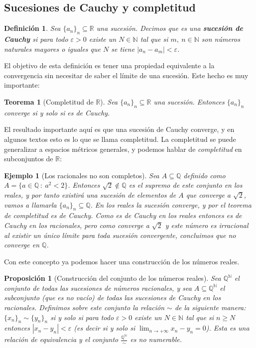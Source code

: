 \documentclass{article}
\newtheorem{theorem}{Teorema}
\newtheorem{prop}{Proposición}
\newtheorem{define}{Definición}
\newtheorem{ejem}{Ejemplo}
\newcommand{\reales}{\mathbb{R}}
\newcommand{\naturales}{\mathbb{N}}
\newcommand{\racionales}{\mathbb{Q}}
\newcommand{\sucesion}[1]{\{ #1 _n \}_n}
\newcommand{\sucreal}[1]{\{ #1 _n \}_n \subseteq \reales}
\newcommand{\limiten}[1]{\lim_{n \rightarrow +\infty} #1}
\begin{document}
\subsection{Sucesiones de Cauchy y completitud}
\begin{define}
	Sea $\sucreal{a}$ una sucesión. Decimos que es una \textbf{sucesión de Cauchy} si para todo $\varepsilon > 0$ existe un $N \in \naturales$ tal que si $m,\ n \in \naturales$ son números naturales mayores o iguales que $N$ se tiene $|a_n - a_m| < \varepsilon$.
\end{define}
El objetivo de esta definición es tener una propiedad equivalente a la convergencia sin necesitar de saber el límite de una sucesión. Este hecho es muy importante:
\begin{theorem}[Completitud de $\reales$]
	Sea $\sucreal{a}$ una sucesión. Entonces $\sucesion{a}$ converge si y solo si es de Cauchy.
\end{theorem}
El resultado importante aquí es que una sucesión de Cauchy converge, y en algunos textos esto es lo que se llama completitud.
La completitud se puede generalizar a espacios métricos generales, y podemos hablar de \textit{completitud} en subconjuntos de $\reales$:
\begin{ejem}[Los racionales no son completos]
	Sea $A \subseteq \racionales$ definido como $A = \{ a\in \racionales\ :\ a^2 < 2\}$. Entonces $\sqrt{2} \not\in \racionales$ es el supremo de este conjunto en los reales, y por tanto existirá una sucesión de elementos de $A$ que converge a $\sqrt{2}$, vamos a llamarla $\sucesion{a} \subseteq \racionales$. En los reales la sucesión converge, y por el teorema de completitud es de Cauchy. Como es de Cauchy en los reales entonces es de Cauchy en los racionales, pero como converge a $\sqrt{2}$ y este número es irracional al existir un único límite para toda sucesión convergente, concluimos que no converge en $\racionales$.
\end{ejem}
Con este concepto ya podemos hacer una construcción de los números reales.
\begin{prop}[Construcción del conjunto de los números reales]
	Sea $\racionales ^ {\naturales}$ el conjunto de todas las sucesiones de números racionales, y sea $A \subseteq \racionales ^ {\naturales}$ el subconjunto (que es no vacío) de todas las sucesiones de Cauchy en los racionales. Definimos sobre este conjunto la relación $\sim$ de la siguiente manera: $\sucesion{x} \sim \sucesion{y}$ si y solo si para todo $\varepsilon > 0$ existe un $N \in \naturales$ tal que si $n \geq N$ entonces $|x_n - y_n| < \varepsilon$ (es decir si y solo si $\limiten{x_n - y_n} = 0$). Esta es una relación de equivalencia y el conjunto $\frac{\racionales ^ {\naturales}}{\sim}$ es no numerable.
\end{prop}
\end{document}
